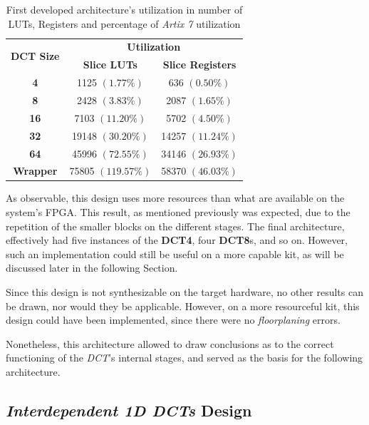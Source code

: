 \begin{table}[!htpb]
    \centering
    \begin{tabular}{ccc} \toprule
        \multirow{2}{*}{\textbf{DCT Size}} &     \multicolumn{2}{c}{\textbf{Utilization}} \\
         &      \textbf{Slice LUTs} &      \textbf{Slice Registers} \\ \toprule
        \textbf{4} &    1125 $(1.77\%)$ &       636 $(0.50\%)$ \\ \hline
        \textbf{8} &    2428 $(3.83\%)$ &       2087 $(1.65\%)$ \\ \hline
        \textbf{16} &   7103 $(11.20\%)$ &      5702 $(4.50\%)$ \\ \hline
        \textbf{32} &   19148 $(30.20\%)$ &     14257 $(11.24\%)$  \\ \hline
        \textbf{64} &   45996 $(72.55\%)$  &    34146 $(26.93\%)$  \\ \bottomrule        
        \textbf{Wrapper} & 75805 $(119.57\%)$ & 58370 $(46.03\%)$ \\
        \bottomrule
    \end{tabular}
    \caption{First developed architecture's utilization in number of LUTs, Registers and percentage of \emph{Artix 7} utilization}
    \label{tab:v1results}
\end{table}

As observable, this design uses more resources than what are available on the system's FPGA. This result, as mentioned previously was expected, due to the repetition of the smaller blocks on the different stages. The final architecture, effectively had five instances of the \textbf{DCT4}, four \textbf{DCT8}s, and so on. However, such an implementation could still be useful on a more capable kit, as will be discussed later in the following Section.

Since this design is not synthesizable on the target hardware, no other results can be drawn, nor would they be applicable. However, on a more resourceful kit, this design could have been implemented, since there were no \emph{\gls{floorplaning}} errors.

Nonetheless, this architecture allowed to draw conclusions as to the correct functioning of the \emph{DCT}'s internal stages, and served as the basis for the following architecture.

\subsection{\emph{Interdependent 1D DCTs} Design}

